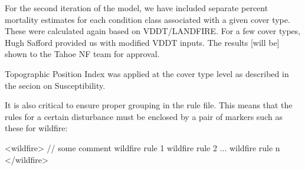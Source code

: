 For the second iteration of the model, we have included separate percent mortality estimates for each condition class associated with a given cover type. These were calculated again based on VDDT/LANDFIRE. For a few cover types, Hugh Safford provided us with modified VDDT inputs. The results [will be] shown to the Tahoe NF team for approval.

Topographic Position Index was applied at the cover type level as described in the secion on Susceptibility.





It is also critical to ensure proper grouping in the rule file. This means that the rules for a certain disturbance must be enclosed by a pair of markers such as these for wildfire:

<wildfire>
// some comment
wildfire rule 1
wildfire rule 2
...
wildfire rule n
</wildfire>
         